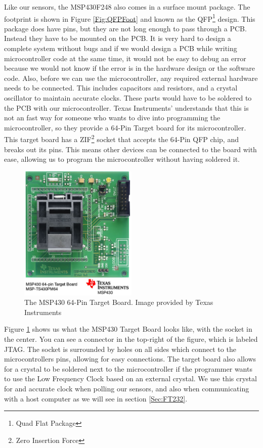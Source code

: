 Like our sensors, the MSP430F248 also comes in a surface mount package.
The footprint is shown in Figure \ref{Fig:QFPFoot}
and known as the QFP\footnote{Quad Flat Package} design.
This package does have pins, but they are not long enough to pass through a PCB.
Instead they have to be mounted on the PCB.
It is very hard to design a complete system without bugs and if we would design a PCB
while writing microcontroller code at the same time,
it would not be easy to debug an error because we would not know if the error
is in the hardware design or the software code.
Also, before we can use the microcontroller,
any required external hardware needs to be connected.
This includes capacitors and resistors,
and a crystal oscillator to maintain accurate clocks.
These parts would have to be soldered to the PCB with our microcontroller.
Texas Instruments' understands that this is not an fast way for someone who wants to dive into programming the microcontroller,
so they provide a 64-Pin Target board for its microcontroller. This target board has
a ZIF\footnote{Zero Insertion Force} socket that accepts the 64-Pin QFP chip,
and breaks out its pins. This means other devices can be connected to the board with ease,
allowing us to program the microcontroller without having soldered it.
\begin{figure}
\begin{center}
\includegraphics[width=0.5\textwidth]{images/mspts430pm64.jpg}
\caption{The MSP430 64-Pin Target Board. Image provided by Texas Instruments}
\label{Fig:MSPTarget}
\end{center}
\end{figure}

Figure \ref{Fig:MSPTarget} shows us what the MSP430 Target Board looks like, with the socket in the center. You can see a connector in the top-right of the figure, which is labeled JTAG. The socket is surrounded by holes on all sides which connect to the microcontrollers pins, allowing for easy connections. The target board also allows for a crystal to be soldered next to the microcontroller if the programmer wants to use the Low Frequency Clock based on an external crystal. We use this crystal for and accurate clock when polling our sensors, and also when communicating with a host computer as we will see in section \ref{Sec:FT232}.

